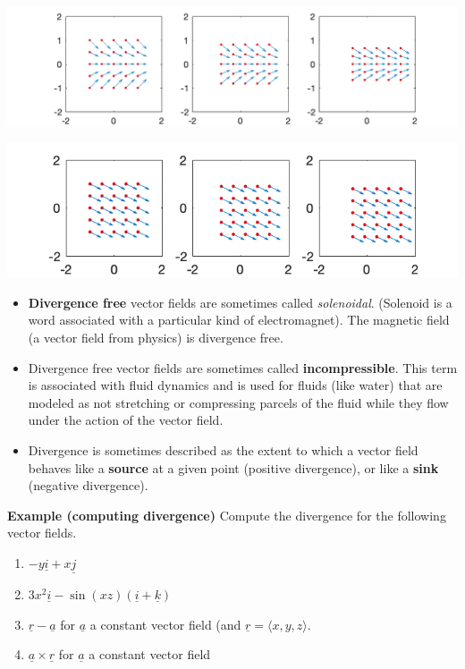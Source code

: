 \documentclass[12pt,letterpaper,noanswers]{exam}
\newcommand{\mb}[1]{\underline{#1}}
\begin{document}
\includegraphics[width=0.9\linewidth]{img/C26p1c.png}

\includegraphics[width=0.9\linewidth]{img/C26p1d.png}

\begin{tcolorbox}
\begin{itemize}
\itemsep0em
    \item \textbf{Divergence free} vector fields are sometimes called \emph{solenoidal}.  (Solenoid is a word associated with a particular kind of electromagnet).  The magnetic field (a vector field from physics) is divergence free.
    \item Divergence free vector fields are sometimes called \textbf{incompressible}.  This term is associated with fluid dynamics and is used for fluids (like water) that are modeled as not stretching or compressing parcels of the fluid while they flow under the action of the vector field.
    \item Divergence is sometimes described as the extent to which a vector field behaves like a \textbf{source} at a given point (positive divergence), or like a \textbf{sink} (negative divergence).
\end{itemize}
\end{tcolorbox}

\noindent\textbf{Example (computing divergence)}
Compute the divergence for the following vector fields.
\begin{enumerate}
\itemsep3em
    \item $-y\mb i + x\mb j$
    \item $3x^2\mb i - \sin(xz)(\mb i + \mb k)$
    \item $\mb r - \mb a$ for $\mb a$ a constant vector field (and $\mb r = \langle x,y,z\rangle$.
    \item $\mb a\times \mb r$ for $\mb a$ a constant vector field
    \vspace{1.3in}
\end{enumerate}
\end{document}
